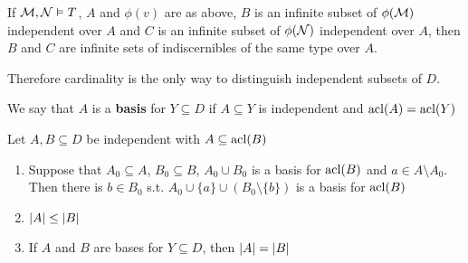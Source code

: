 \documentclass[11pt]{article}
\begin{document}
\begin{corollary}[]
\label{cor6.1.7}
If \(\mathcal{M},\mathcal{N}\vDash T\), \(A\) and \(\phi(v)\) are as above, \(B\) is an infinite subset of \(\phi(\mathcal{M})\)
independent over \(A\) and \(C\) is an infinite subset of \(\phi(\mathcal{N})\) independent over \(A\),
then \(B\) and \(C\) are infinite sets of indiscernibles of the same type over \(A\).
\end{corollary}

Therefore cardinality is the only way to distinguish independent subsets of \(D\).

\begin{definition}[]
We say that \(A\) is a \textbf{basis} for \(Y\subseteq D\) if \(A\subseteq Y\) is independent and \(\operatorname{acl}(A)=\operatorname{acl}(Y)\)
\end{definition}

\begin{lemma}[]
Let \(A,B\subseteq D\) be independent with \(A\subseteq\operatorname{acl}(B)\)
\begin{enumerate}
\item Suppose that \(A_0\subseteq A\), \(B_0\subseteq B\), \(A_0\cup B_0\) is a basis for \(\operatorname{acl}(B)\)
and \(a\in A\setminus A_0\). Then there is \(b\in B_0\) s.t. \(A_0\cup\{a\}\cup(B_0\setminus\{b\})\) is a basis for \(\operatorname{acl}(B)\)
\item \(\abs{A}\le\abs{B}\)
\item If \(A\) and \(B\) are bases for \(Y\subseteq D\), then \(\abs{A}=\abs{B}\)
\end{enumerate}
\end{lemma}
\end{document}
